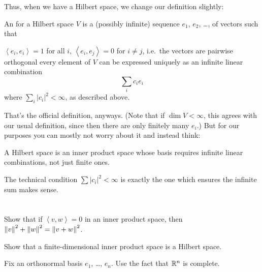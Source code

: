 Thus, when we have a Hilbert space, we change our definition slightly:
\begin{definition}
	An  for a Hilbert space $V$
	is a (possibly infinite) sequence $e_1$, $e_2$, \dots,
	of vectors such that
	\begin{itemize}
		\ii $\left< e_i, e_i \right> = 1$ for all $i$,
		\ii $\left< e_i, e_j \right> = 0$ for $i \ne j$,
		i.e.\ the vectors are pairwise orthogonal
		\ii every element of $V$ can be expressed uniquely as an
		infinite linear combination
		\[ \sum_i c_i e_i \]
		where $\sum_i \left\lvert c_i \right\rvert^2 < \infty$,
		as described above.
	\end{itemize}
\end{definition}
That's the official definition, anyways.
(Note that if $\dim V < \infty$, this agrees with our usual definition,
since then there are only finitely many $e_i$.)
But for our purposes you can mostly not worry about it and instead think:
\begin{moral}
	A Hilbert space is an inner product space
	whose basis requires infinite linear combinations,
	not just finite ones.
\end{moral}
The technical condition $\sum \left\lvert c_i \right\rvert^2 < \infty$
is exactly the one which ensures the infinite sum makes sense.

\section{\problemhead}

\begin{problem}
	Show that if $\left< v,w \right> = 0$ in an inner product space,
	then $\left\lVert v \right\rVert^2 + \left\lVert w \right\rVert^2 = \left\lVert v+w \right\rVert^2$.
\end{problem}

\begin{sproblem}
	Show that a finite-dimensional inner product space
	is a Hilbert space.
	\begin{hint}
		Fix an orthonormal basis $e_1$, \dots, $e_n$.
		Use the fact that $\mathbb R^n$ is complete.
	\end{hint}
\end{sproblem}


